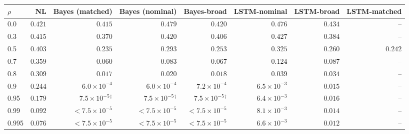 \begin{tabular}{lrrrrrrr}
\toprule
$\rho$ & NL & Bayes (matched) & Bayes (nominal) & Bayes-broad & LSTM-nominal & LSTM-broad & LSTM-matched \\
\midrule
0.0 & $0.421$ & $0.415$ & $0.479$ & $0.420$ & $0.476$ & $0.434$ & -- \\
0.3 & $0.415$ & $0.370$ & $0.420$ & $0.406$ & $0.427$ & $0.384$ & -- \\
0.5 & $0.403$ & $0.235$ & $0.293$ & $0.253$ & $0.325$ & $0.260$ & $0.242$ \\
0.7 & $0.359$ & $0.060$ & $0.083$ & $0.067$ & $0.124$ & $0.087$ & -- \\
0.8 & $0.309$ & $0.017$ & $0.020$ & $0.018$ & $0.039$ & $0.034$ & -- \\
0.9 & $0.244$ & $6.0\!\times\!10^{-4}$ & $6.0\!\times\!10^{-4}$ & $7.2\!\times\!10^{-4}$ & $6.5\!\times\!10^{-3}$ & $0.015$ & -- \\
0.95 & $0.179$ & $7.5\!\times\!10^{-5}$$^\dagger$ & $7.5\!\times\!10^{-5}$$^\dagger$ & $7.5\!\times\!10^{-5}$$^\dagger$ & $6.4\!\times\!10^{-3}$ & $0.016$ & -- \\
0.99 & $0.092$ & $<7.5\!\times\!10^{-5}$ & $<7.5\!\times\!10^{-5}$ & \textit{$<7.5\!\times\!10^{-5}$} & $8.1\!\times\!10^{-3}$ & \textit{$0.014$} & -- \\
0.995 & $0.076$ & $<7.5\!\times\!10^{-5}$ & $<7.5\!\times\!10^{-5}$ & \textit{$<7.5\!\times\!10^{-5}$} & $6.6\!\times\!10^{-3}$ & \textit{$0.012$} & -- \\
\bottomrule
\end{tabular}